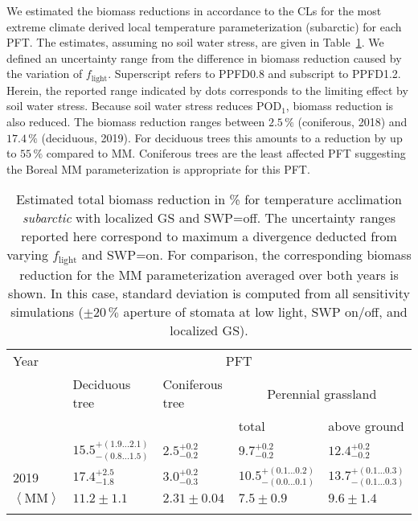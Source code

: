 \documentclass[bg, manuscript]{copernicus}
\begin{document}
We estimated the biomass reductions in accordance to the CLs \citep{ICP:MappingManual2017, ESPR:Hayes2021} for the most extreme climate derived local temperature parameterization (subarctic) for each PFT. The estimates, assuming no soil water stress, are given in Table~\ref{tab:biomass_reduction}. We defined an uncertainty range from the difference in biomass reduction caused by the variation of $f_\mathrm{light}$. Superscript refers to PPFD0.8 and subscript to PPFD1.2. Herein, the reported range indicated by dots corresponds to the limiting effect by soil water stress. Because soil water stress reduces $\mathrm{POD_1}$, biomass reduction is also reduced. The biomass reduction ranges between $2.5\,\unit{\%}$ (coniferous, 2018) and $17.4\,\unit{\%}$ (deciduous, 2019). For deciduous trees this amounts to a reduction by up to $55\,\unit{\%}$ compared to MM.
Coniferous trees are the least affected PFT suggesting the Boreal MM parameterization is appropriate for this PFT.

\begin{table}[t]
  \caption{Estimated total biomass reduction in \unit{\%} for temperature acclimation \emph{subarctic} with localized GS and SWP=off. The uncertainty ranges reported here correspond to maximum a divergence deducted from varying $f_\mathrm{light}$ and SWP=on. For comparison, the corresponding biomass reduction for the MM parameterization averaged over both years is shown. In this case, standard deviation is computed from all sensitivity simulations ($\pm 20\,\unit{\%}$ aperture of stomata at low light, SWP on/off, and localized GS).}
  \label{tab:biomass_reduction}
\begin{tabular}{lllll}
\tophline
Year & \multicolumn{4}{c}{PFT}\\
& Deciduous tree& Coniferous tree & \multicolumn{2}{c}{Perennial grassland}\\
& & & total & above ground\\
\middlehline
2018 & $15.5^{+(1.9...2.1)}_{-(0.8...1.5)}$ & $2.5^{+0.2}_{-0.2}$ & $9.7^{+0.2}_{-0.2}$ & $12.4^{+0.2}_{-0.2}$\\
2019 & $17.4^{+2.5}_{-1.8}$ & $3.0^{+0.2}_{-0.3}$ & $10.5^{+(0.1...0.2)}_{-(0.0...0.1)}$ & $13.7^{+(0.1...0.3)}_{-(0.1...0.3)}$\\
\middlehline
$\left<\mathrm{MM}\right>$ & $11.2\pm 1.1$ & $2.31\pm 0.04$ & $7.5\pm 0.9$ & $9.6\pm 1.4$\\
\bottomhline
\end{tabular}
\end{table}
\end{document}
